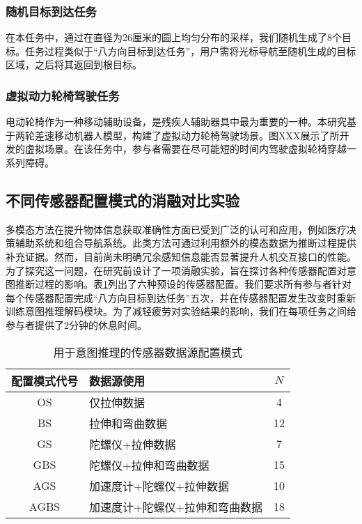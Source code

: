    \subsubsection{随机目标到达任务}在本任务中，通过在直径为26厘米的圆上均匀分布的采样，我们随机生成了8个目标。任务过程类似于``八方向目标到达任务''，用户需将光标导航至随机生成的目标区域，之后将其返回到根目标。

   \subsubsection{虚拟动力轮椅驾驶任务}电动轮椅作为一种移动辅助设备，是残疾人辅助器具中最为重要的一种。本研究基于两轮差速移动机器人模型，构建了虚拟动力轮椅驾驶场景。图XXX展示了所开发的虚拟场景。在该任务中，参与者需要在尽可能短的时间内驾驶虚拟轮椅穿越一系列障碍。  

\subsection{不同传感器配置模式的消融对比实验} 多模态方法在提升物体信息获取准确性方面已受到广泛的认可和应用，例如医疗决策辅助系统和组合导航系统\cite{williamsonContinuousUncertainInteraction2006}。此类方法可通过利用额外的模态数据为推断过程提供补充证据。然而，目前尚未明确冗余感知信息能否显著提升人机交互接口的性能。为了探究这一问题，在研究前设计了一项消融实验，旨在探讨各种传感器配置对意图推断过程的影响。表\ref{tab3-1}列出了六种预设的传感器配置。我们要求所有参与者针对每个传感器配置完成``八方向目标到达任务''五次，并在传感器配置发生改变时重新训练意图推理解码模块。为了减轻疲劳对实验结果的影响，我们在每项任务之间给参与者提供了2分钟的休息时间。 

\begin{table}
    \centering
    \caption{用于意图推理的传感器数据源配置模式}
    \setlength{\tabcolsep}{3pt}
    \begin{tabular}{c p{180pt} c }
    \hline\hline
    配置模式代号 & 数据源使用 & $N$ \\ 
    \hline
    OS& 仅拉伸数据& 4 \\ 
    BS& 拉伸和弯曲数据&12 \\ 
    GS& 陀螺仪+拉伸数据&7 \\ 
    GBS& 陀螺仪+拉伸和弯曲数据&15 \\ 
    AGS& 加速度计+陀螺仪+拉伸数据&10 \\ 
    AGBS& 加速度计+陀螺仪+拉伸和弯曲数据&18 \\ 
    \hline\hline
    \end{tabular}
    \label{tab3-1}
\end{table}     


